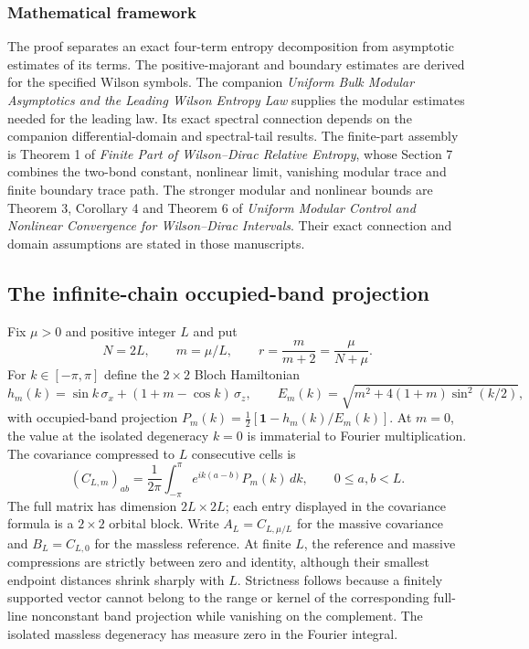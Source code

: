 \documentclass[
  10pt,
  a4paper,
]{article}
\begin{document}
\subsubsection{Mathematical framework}\label{mathematical-framework}

The proof separates an exact four-term entropy decomposition from asymptotic estimates of its terms. The positive-majorant and boundary estimates are derived for the specified Wilson symbols. The companion \emph{Uniform Bulk Modular Asymptotics and the Leading Wilson Entropy Law} supplies the modular estimates needed for the leading law. Its exact spectral connection depends on the companion differential-domain and spectral-tail results. The finite-part assembly is Theorem 1 of \emph{Finite Part of Wilson--Dirac Relative Entropy}, whose Section 7 combines the two-bond constant, nonlinear limit, vanishing modular trace and finite boundary trace path. The stronger modular and nonlinear bounds are Theorem 3, Corollary 4 and Theorem 6 of \emph{Uniform Modular Control and Nonlinear Convergence for Wilson--Dirac Intervals}. Their exact connection and domain assumptions are stated in those manuscripts.

\subsection{The infinite-chain occupied-band projection}\label{the-infinite-chain-occupied-band-projection}

Fix \(\mu>0\) and positive integer \(L\) and put \begin{equation}
\label{eq:parameters}
N=2L,\qquad m=\mu/L,\qquad r=\frac{m}{m+2}=\frac{\mu}{N+\mu}.
\end{equation} For \(k\in[-\pi,\pi]\) define the \(2\times2\) Bloch Hamiltonian \begin{equation}
\label{eq:bloch}
h_m(k)=\sin k\,\sigma_x+(1+m-\cos k)\,\sigma_z,
\qquad E_m(k)=\sqrt{m^2+4(1+m)\sin^2(k/2)},
\end{equation} with occupied-band projection \(P_m(k)=\tfrac12[\mathbf 1-h_m(k)/E_m(k)]\). At \(m=0\), the value at the isolated degeneracy \(k=0\) is immaterial to Fourier multiplication. The covariance compressed to \(L\) consecutive cells is \begin{equation}
\label{eq:covariance}
(C_{L,m})_{ab}=\frac1{2\pi}\int_{-\pi}^{\pi}e^{ik(a-b)}P_m(k)\,dk,
\qquad 0\le a,b<L.
\end{equation} The full matrix has dimension \(2L\times2L\); each entry displayed in the covariance formula is a \(2\times2\) orbital block. Write \(A_L=C_{L,\mu/L}\) for the massive covariance and \(B_L=C_{L,0}\) for the massless reference. At finite \(L\), the reference and massive compressions are strictly between zero and identity, although their smallest endpoint distances shrink sharply with \(L\). Strictness follows because a finitely supported vector cannot belong to the range or kernel of the corresponding full-line nonconstant band projection while vanishing on the complement. The isolated massless degeneracy has measure zero in the Fourier integral.
\end{document}
